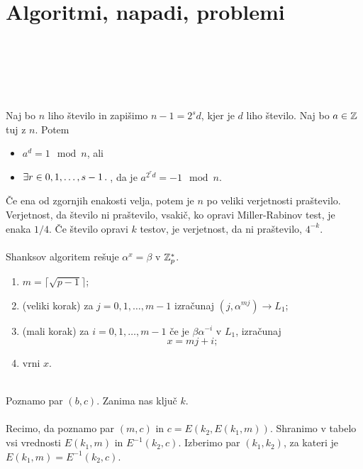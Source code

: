 \section{Algoritmi, napadi, problemi}
\\
\\
\\
\\
\\
Naj bo \(n\) liho število in zapišimo \(n - 1 = 2^s d\), kjer je \(d\) liho število. Naj bo \(a \in \mathbb{Z}\) tuj z \(n\). Potem
\begin{itemize}
    \item \(a^d = 1 \mod n\), ali
    \item \(\exists r \in {0, 1, \ldots, s-1} \,.\,\), da je \(a^{2^rd} = -1 \mod n\).
\end{itemize}
Če ena od zgornjih enakosti velja, potem je \(n\) po veliki verjetnosti praštevilo. Verjetnost, da število ni praštevilo, vsakič, ko opravi Miller-Rabinov test, je enaka \(1/4\). Če število opravi \(k\) testov, je verjetnost, da ni praštevilo, \(4^{-k}\).\\
%
\\
Shanksov algoritem rešuje \(\alpha^x = \beta\) v \(\mathbb{Z}_p^*\).
\begin{enumerate}
    \item  \(m = \lceil \sqrt{p - 1} \rceil\);
    \item (veliki korak) za \(j = 0, 1, \ldots, m - 1\) izračunaj \((j, \alpha^{mj}) \to L_1\);
    \item (mali korak) za \(i = 0, 1, \ldots, m - 1\) če je \(\beta \alpha^{-i}\) v \(L_1\), izračunaj \[x = mj + i;\]
    \item vrni \(x\).
\end{enumerate}
\\
Poznamo par \((b, c)\). Zanima nas ključ \(k\).\\
\\
Recimo, da poznamo par \((m, c)\) in \(c = E(k_2, E(k_1, m))\). Shranimo v tabelo vsi vrednosti \(E(k_1, m)\) in \(E^{-1}(k_2, c)\). Izberimo par \((k_1, k_2)\), za kateri je \(E(k_1, m) = E^{-1}(k_2, c)\).\\
